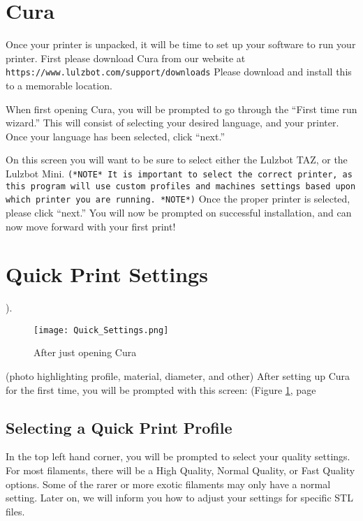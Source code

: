 %
%
%
%
%

\section{Cura}

Once your printer is unpacked, it will be time to set up your software to run your printer. First please download Cura from our website at  \texttt{https://www.lulzbot.com/support/downloads} Please download and install this to a memorable location. 

When first opening Cura, you will be prompted to go through the “First time run wizard.” This will consist of selecting your desired language, and your printer. Once your language has been selected, click “next.”

On this screen you will want to be sure to select either the Lulzbot TAZ, or the Lulzbot Mini. \texttt{(*NOTE* It is important to select the correct printer, as this program will use custom profiles and machines settings based upon which printer you are running. *NOTE*)} Once the proper printer is selected, please click “next.” You will now be prompted on successful installation, and can now move forward with your first print!

\section{Quick Print Settings}
\pageref{fig:Cura}).
\begin{figure}[hbt]
\centering
\texttt{[image: Quick\_Settings.png]}
\caption{After just opening Cura}
\label{fig:Cura}
\end{figure} (photo highlighting profile, material, diameter, and other)
After setting up Cura for the first time, you will be prompted with this screen: (Figure \ref{fig:Cura}, page 

\subsection{Selecting a Quick Print Profile}

In the top left hand corner, you will be prompted to select your quality settings. For most filaments, there will be a High Quality, Normal Quality, or Fast Quality options. Some of the rarer or more exotic filaments may only have a normal setting. Later on, we will inform you how to adjust your settings for specific STL files.

